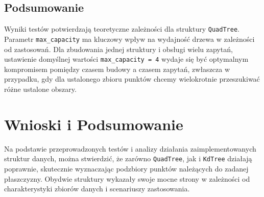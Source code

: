 \documentclass[12pt]{article}
\begin{document}
\subsection{Podsumowanie}

Wyniki testów potwierdzają teoretyczne zależności dla struktury \texttt{QuadTree}. Parametr \texttt{max\_capacity} ma kluczowy wpływ na wydajność drzewa w zależności od zastosowań.
Dla zbudowania jednej struktury i obsługi wielu zapytań, ustawienie domyślnej wartości \texttt{max\_capacity = 4} wydaje się być optymalnym kompromisem pomiędzy czasem budowy a czasem zapytań, zwłaszcza w przypadku, gdy dla ustalonego zbioru punktów chcemy wielokrotnie przeszukiwać różne ustalone obszary.
\newpage

\section{Wnioski i Podsumowanie}

Na podstawie przeprowadzonych testów i analizy działania zaimplementowanych struktur danych, można stwierdzić, że zarówno \texttt{QuadTree}, jak i \texttt{KdTree} działają poprawnie, skutecznie wyznaczając podzbiory punktów należących do zadanej płaszczyzny. Obydwie struktury wykazały swoje mocne strony w zależności od charakterystyki zbiorów danych i scenariuszy zastosowania.
\end{document}
